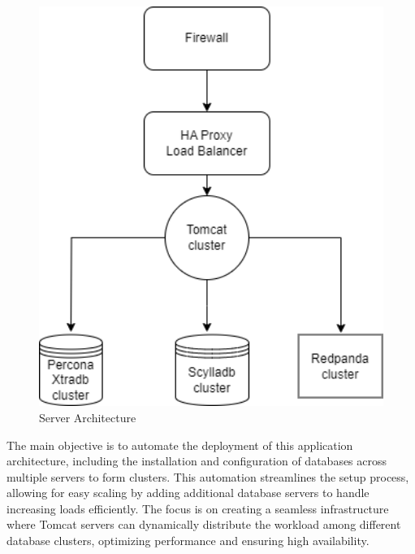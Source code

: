 \documentclass[12pt,a4paper,oneside]{report}
\begin{document}
\begin{figure}[ht]
    \centering
    \includegraphics[width=120mm , height = 130mm]{images/deploy.drawio.png}
    \caption{Server Architecture}
    \label{fig:figure2_2}
\end{figure}

\par The main objective is to automate the deployment of this application architecture, including the installation and configuration of databases across multiple servers to form clusters. This automation streamlines the setup process, allowing for easy scaling by adding additional database servers to handle increasing loads efficiently. The focus is on creating a seamless infrastructure where Tomcat servers can dynamically distribute the workload among different database clusters, optimizing performance and ensuring high availability.
\end{document}
